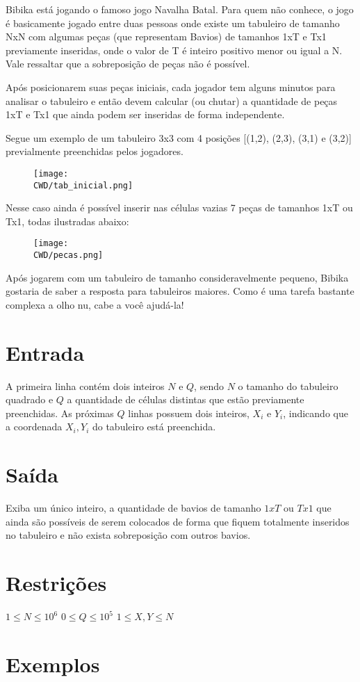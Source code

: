 Bibika está jogando o famoso jogo Navalha Batal. Para quem não conhece, o jogo é basicamente jogado entre duas pessoas onde existe um tabuleiro de tamanho NxN com algumas peças (que representam Bavios) de tamanhos 1xT e Tx1 previamente inseridas, onde o valor de T é inteiro positivo menor ou igual a N. Vale ressaltar que a sobreposição de peças não é possível.

Após posicionarem suas peças iniciais, cada jogador tem alguns minutos para analisar o tabuleiro e então devem calcular (ou chutar) a quantidade de peças 1xT e Tx1 que ainda podem ser inseridas de forma independente. \newline

Segue um exemplo de um tabuleiro 3x3 com 4 posições [(1,2), (2,3), (3,1) e (3,2)] previalmente preenchidas pelos jogadores.

\begin{figure}[h!]
\centering
\texttt{[image: \\CWD/tab\_inicial.png]}
\end{figure}

Nesse caso ainda é possível inserir nas células vazias 7 peças de tamanhos 1xT ou Tx1, todas ilustradas abaixo:

\begin{figure}[h!]
\centering
\texttt{[image: \\CWD/pecas.png]}
\end{figure}

Após jogarem com um tabuleiro de tamanho consideravelmente pequeno, Bibika gostaria de saber a resposta para tabuleiros maiores. Como é uma tarefa bastante complexa a olho nu, cabe a você ajudá-la!

\section*{Entrada}

A primeira linha contém dois inteiros $N$ e $Q$, sendo $N$ o tamanho do tabuleiro quadrado e $Q$ a quantidade de células distintas que estão previamente preenchidas.
As próximas $Q$ linhas possuem dois inteiros, $X_i$ e $Y_i$, indicando que a coordenada $X_i, Y_i$ do tabuleiro está preenchida.

\section*{Saída}

Exiba um único inteiro, a quantidade de bavios de tamanho $1xT$ ou $Tx1$ que ainda são possíveis de serem colocados de forma que fiquem totalmente inseridos no tabuleiro e não exista sobreposição com outros bavios.

\section*{Restrições}

$1 \leq N \leq 10^6$
$0 \leq Q \leq 10^5$
$1 \leq X, Y \leq N$

\section*{Exemplos}
\exemplo
